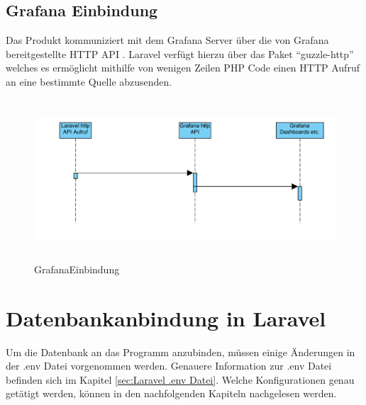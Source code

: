 \subsection{Grafana Einbindung}
Das Produkt kommuniziert mit dem Grafana Server über die von Grafana bereitgestellte HTTP API . Laravel verfügt hierzu über das Paket “guzzle-http” welches es ermöglicht mithilfe von wenigen Zeilen PHP Code einen HTTP Aufruf an eine bestimmte Quelle abzusenden.
\begin{figure}[h]
	\centering
	\includegraphics[height=6cm,width=18cm]{images/GrafanaEinbindung}
	\caption{GrafanaEinbindung}
	\label{fig:GrafanaEinbindung}
\end{figure}





\section{Datenbankanbindung in Laravel}
Um die Datenbank an das Programm anzubinden, müssen einige Änderungen in der .env Datei vorgenommen werden. Genauere Information zur .env Datei befinden sich im Kapitel  \ref{sec:Laravel .env Datei}. Welche Konfigurationen genau getätigt werden, können in den nachfolgenden Kapiteln nachgelesen werden. 


